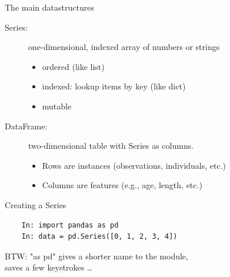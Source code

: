\documentclass[aspectratio=169,usenames,dvipsnames]{beamer}
\begin{document}
\begin{frame}{The main datastructures}
    \begin{description}
        \item[Series:] one-dimensional, indexed array of numbers or strings
            \begin{itemize}
                \item ordered (like list)
                \item indexed: lookup items by key (like dict)
                \item mutable
            \end{itemize}
        \item[DataFrame:] two-dimensional table with Series as columns.
            \begin{itemize}
                \item Rows are instances (observations, individuals, etc.)
                \item Columns are features (e.g., age, length, etc.)
            \end{itemize}
    \end{description}
\end{frame}

\begin{frame}[fragile]{Creating a Series}
    \begin{lstlisting}
    In: import pandas as pd
    In: data = pd.Series([0, 1, 2, 3, 4])
    \end{lstlisting}

    \vspace{1em}
    BTW: "as pd" gives a shorter name to the module, \\
    saves a few keystrokes \dots
\end{frame}
\end{document}
